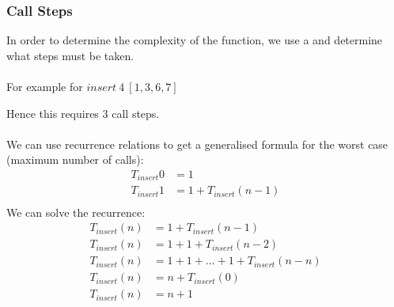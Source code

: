 \documentclass{report}
\begin{document}
\subsubsection*{Call Steps}
In order to determine the complexity of the function, we use a  and determine what steps must be taken.
\\
\\ For example for $insert \ 4 \ [1,3,6,7]$
\\ \begin{steps}
\end{steps}
Hence this requires $3$ call steps.
\\
\\ We can use recurrence relations to get a generalised formula for the worst case (maximum number of calls):
\[\begin{matrix}
		T_{insert} 0 & = 1                   \\
		T_{insert} 1 & = 1 + T_{insert}(n-1) \\
	\end{matrix}\]
We can solve the recurrence:
\[\begin{matrix}
		T_{insert} (n) & = 1 + T_{insert}(n-1)                 \\
		T_{insert} (n) & = 1 + 1 + T_{insert}(n-2)             \\
		T_{insert} (n) & = 1 + 1 + \dots + 1 + T_{insert}(n-n) \\
		T_{insert} (n) & = n + T_{insert}(0)                   \\
		T_{insert} (n) & = n + 1                               \\
	\end{matrix}\]
\end{document}
